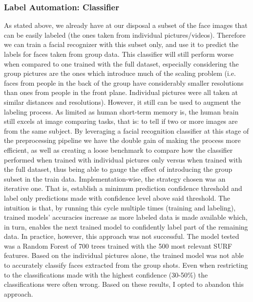 \documentclass[11pt]{article}
\begin{document}
    \subsubsection{Label Automation: Classifier}\label{sec:face_labeling:classifier}
        As stated above, we already have at our disposal a subset of the face images that can be easily labeled (the ones taken from individual pictures/videos). Therefore we can train a facial recognizer with this subset only, and use it to predict the labels for faces taken from group data. This classifier will still perform worse when compared to one trained with the full dataset, especially considering the group pictures are the ones which introduce much of the scaling problem (i.e. faces from people in the back of the group have considerably smaller resolutions than ones from people in the front plane. Individual pictures were all taken at similar distances and resolutions). However, it still can be used to augment the labeling process. As limited as human short-term memory is, the human brain still excels at image comparing tasks, that is: to tell if two or more images are from the same subject. By leveraging a facial recognition classifier at this stage of the preprocessing pipeline we have the double gain of making the process more efficient, as well as creating a loose benchmark to compare how the classifier performed when trained with individual pictures only versus when trained with the full dataset, thus being able to gauge the effect of introducing the group subset in the train data. Implementation-wise, the strategy chosen was an iterative one. That is, establish a minimum prediction confidence threshold and label only predictions made with confidence level above said threshold. The intuition is that, by running this cycle multiple times (training and labeling), trained models' accuracies increase as more labeled data is made available which, in turn, enables the next trained model to confidently label part of the remaining data.
        In practice, however, this approach was not successful. The model tested was a Random Forest of 700 trees trained with the 500 most relevant SURF features. Based on the individual pictures alone, the trained model was not able to accurately classify faces extracted from the group shots. Even when restricting to the classifications made with the highest confidence (30-50\%) the classifications were often wrong. Based on these results, I opted to abandon this approach.
\end{document}
